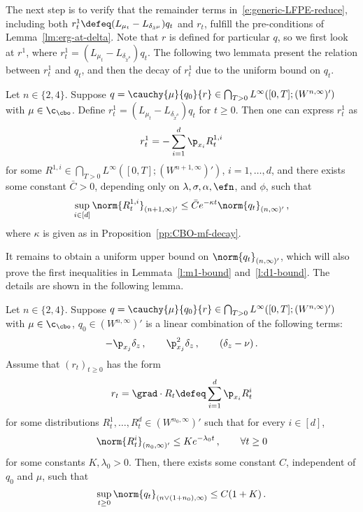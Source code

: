 \documentclass{amsart}
\begin{document}
The next step is to verify that the remainder terms in~\eqref{e:generic-LFPE-reduce}, including both $r^1_t \defeq (L_{\mu_t} - L_{\delta_{\tilde x^\mu}}) q_t$ and $r_t$, fulfill the pre-conditions of Lemma~\ref{lm:erg-at-delta}.
Note that $r$ is defined for particular $q$, so we first look at $r^1$, where $r^1_t = (L_{\mu_t} - L_{\delta_{\tilde x^\mu}}) q_t$. 
The following two lemmata present the relation between $r^1_t$ and $q_t$, and then the decay of $r^1_t$ due to the uniform bound on $q_t$. 

\begin{lemma}
	\label{lm:connect-r1-q}
	Let $n \in \{2,4\}$. 
	Suppose $q = \cauchy{\mu}{q_0}{r} \in \bigcap_{T>0} L^\infty([0,T]; (W^{n,\infty})')$ with $\mu \in \c_\cbo$. 
	Define $r^1_t = (L_{\mu_t} - L_{\delta_{\tilde x^\mu}}) q_t$ for $t \ge 0$. 
	Then one can express $r^1_t$ as 
	\begin{equation*}
		r^1_t = - \sum_{i=1}^d \p_{x_i} R^{1,i}_t 
	\end{equation*}
	for some $R^{1,i} \in \bigcap_{T>0} L^\infty([0,T]; (W^{n+1,\infty})')$, $i = 1,\dots,d$, and there exists some constant $\bar C > 0$, depending only on $\lambda, \sigma, \alpha, \efn$, and $\phi$, such that 
	\begin{equation*}
		\sup_{i \in [d]} \norm{R^{1,i}_t}_{(n+1,\infty)'} \le \bar C e^{-\kappa t} \norm{q_t}_{(n,\infty)'} \,, 
	\end{equation*}
	where $\kappa$ is given as in Proposition~\ref{pp:CBO-mf-decay}.
\end{lemma}

It remains to obtain a uniform upper bound on $\norm{q_t}_{(n,\infty)'}$, which will also prove the first inequalities in Lemmata~\ref{l:m1-bound} and~\ref{l:d1-bound}.
The details are shown in the following lemma. 
\begin{lemma}
	\label{lm:bound-q}
	Let $n \in \{2,4\}$. 
	Suppose $q = \cauchy{\mu}{q_0}{r} \in \bigcap_{T>0} L^\infty([0,T]; (W^{n,\infty})')$ with $\mu \in \c_\cbo$, $q_0 \in (W^{n,\infty})'$ is a linear combination of the following terms:
	\begin{equation*}
		-\p_{x_j} \delta_z \,, \qquad \p_{x_j}^2 \delta_z \,, \qquad (\delta_z -\nu) \,.
	\end{equation*}
	Assume that $(r_t)_{t \ge 0}$ has the form 
	\begin{equation*}
		r_t = \grad \cdot R_t \defeq \sum_{i=1}^d \p_{x_i} R^i_t
	\end{equation*}
	for some distributions $R^1_t, \dots, R^d_t \in (W^{n_0,\infty})'$ such that for every $i \in [d]$,
	\begin{equation*}
		\norm{R^i_t}_{(n_0,\infty)'} \le K e^{-\lambda_0 t} \,, \qquad \forall t \ge 0
	\end{equation*} 
	for some constants $K, \lambda_0 > 0$. 
	Then, there exists some constant $C$, independent of $q_0$ and $\mu$, such that 
	\begin{equation*}
		\sup_{t \ge 0} \norm{q_t}_{(n \lor (1+n_0),\infty)} \le C (1 + K) \,.
	\end{equation*}
\end{lemma}
\end{document}
